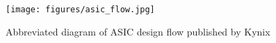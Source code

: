 
\begin{figure}[t]
    \label{fig:asic_flow}
    \centering
    \texttt{[image: figures/asic\_flow.jpg]}
    \caption{Abbreviated diagram of ASIC design flow published by Kynix \cite{kynixDesignFlow}}
\end{figure}
